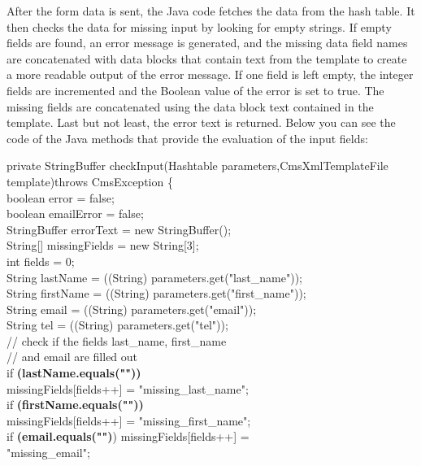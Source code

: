 After the form data is sent, the Java code fetches the data from the
hash table. It then checks the data for missing input by looking for
empty strings. If empty fields are found, an error message is generated,
and the missing data field names are concatenated with data blocks that
contain text from the template to create a more readable output of the
error message. If one field is left empty, the integer fields are
incremented and the Boolean value of the error is set to true. The
missing fields are concatenated using the data block text contained in
the template. Last but not least, the error text is returned. Below you
can see the code of the Java methods that provide the evaluation of the
input fields:

\begin{java}
private StringBuffer checkInput(Hashtable parameters,CmsXmlTemplateFile template)throws CmsException \{\\
\jtabc        boolean error = false;\\
\jtabc        boolean emailError = false;\\
\jtabc        StringBuffer errorText = new StringBuffer();\\
\jtabc        String[] missingFields = new String[3];\\
\jtabc        int fields = 0;\\
\jtabc        String lastName = ((String) parameters.get("last\_name"));\\
\jtabc        String firstName = ((String) parameters.get("first\_name"));\\
\jtabc        String email = ((String) parameters.get("email"));\\
\jtabc        String tel = ((String) parameters.get("tel"));\\
\jtabc        // check if the fields last\_name, first\_name\\
\jtabd         // and email are filled out\\
\jtabc        if {\bf(lastName.equals(""))}\\
\jtabe                missingFields[fields++] = "missing\_last\_name";\\
\jtabc        if {\bf(firstName.equals(""))}\\
\jtabe                missingFields[fields++] = "missing\_first\_name";\\
\jtabe        if {\bf(email.equals("")}) missingFields[fields++] =\\
\jtabf         "missing\_email";\\

\end{java}

